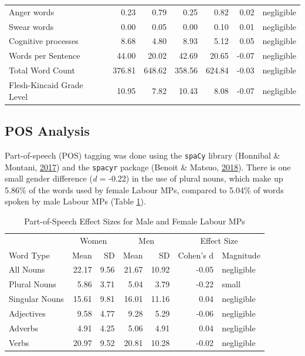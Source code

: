 \documentclass[]{article}
\theoremstyle{definition}
\theoremstyle{definition}
\theoremstyle{definition}
\theoremstyle{remark}
\begin{document}
\begin{table}[H]
\begin{tabular}[t]{lrrrrrl}
Anger words & 0.23 & 0.79 & 0.25 & 0.82 & 0.02 & negligible\\
Swear words & 0.00 & 0.05 & 0.00 & 0.10 & 0.01 & negligible\\
Cognitive processes & 8.68 & 4.80 & 8.93 & 5.12 & 0.05 & negligible\\
\addlinespace
Words per Sentence & 44.00 & 20.02 & 42.69 & 20.65 & -0.07 & negligible\\
Total Word Count & 376.81 & 648.62 & 358.56 & 624.84 & -0.03 & negligible\\
Flesh-Kincaid Grade Level & 10.95 & 7.82 & 10.43 & 8.08 & -0.07 & negligible\\
\bottomrule
\end{tabular}
\end{table}

\hypertarget{pos-analysis}{%
\subsection{POS Analysis}\label{pos-analysis}}

Part-of-speech (POS) tagging was done using the \texttt{spaCy} library
(Honnibal \& Montani, \protect\hyperlink{ref-honnibal2017}{2017}) and
the \texttt{spacyr} package (Benoit \& Matsuo,
\protect\hyperlink{ref-benoit2018a}{2018}). There is one small gender
difference (\emph{d} = -0.22) in the use of plural nouns, which make up
5.86\% of the words used by female Labour MPs, compared to 5.04\% of
words spoken by male Labour MPs (Table \ref{tab:pos-gender-table}).

\begin{table}[H]

\caption{\label{tab:pos-gender-table}Part-of-Speech Effect Sizes for Male and Female Labour MPs}
\centering
\begin{tabular}[t]{lrrrrrl}
\toprule
\multicolumn{1}{c}{ } & \multicolumn{2}{c}{Women} & \multicolumn{2}{c}{Men} & \multicolumn{2}{c}{Effect Size} \\
\cmidrule(l{2pt}r{2pt}){2-3} \cmidrule(l{2pt}r{2pt}){4-5} \cmidrule(l{2pt}r{2pt}){6-7}
Word Type & Mean & SD & Mean & SD & Cohen's d & Magnitude\\
\midrule
All Nouns & 22.17 & 9.56 & 21.67 & 10.92 & -0.05 & negligible\\
\hspace{1em}Plural Nouns & 5.86 & 3.71 & 5.04 & 3.79 & -0.22 & small\\
\hspace{1em}Singular Nouns & 15.61 & 9.81 & 16.01 & 11.16 & 0.04 & negligible\\
Adjectives & 9.58 & 4.77 & 9.28 & 5.29 & -0.06 & negligible\\
Adverbs & 4.91 & 4.25 & 5.06 & 4.91 & 0.04 & negligible\\
Verbs & 20.97 & 9.52 & 20.81 & 10.28 & -0.02 & negligible\\
\bottomrule
\end{tabular}
\end{table}
\end{document}
